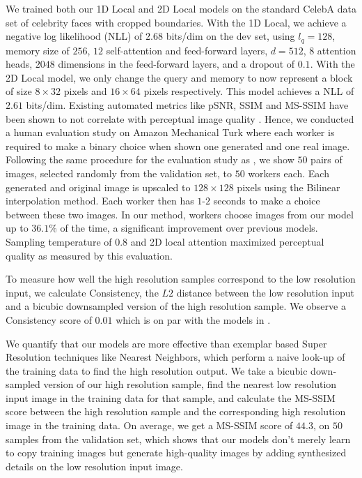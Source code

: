 \documentclass{article}
\newcommand{\modeldim}{d}
\begin{document}
We trained both our 1D Local and 2D Local models on the standard CelebA data set of celebrity faces with cropped boundaries. With the 1D Local, we achieve a negative log likelihood (NLL) of $\mathbf{2.68}$ bits/dim on the dev set, using $l_q=128$, memory size of $256$, $12$ self-attention and feed-forward layers, $\modeldim=512$, $8$ attention heads, $2048$ dimensions in the feed-forward layers, and a dropout of $0.1$. With the 2D Local model, we only change the query and memory to now represent a block of size $8\times32$ pixels and $16\times64$ pixels respectively. This model achieves a NLL of $\mathbf{2.61}$ bits/dim.
Existing automated metrics like pSNR, SSIM and MS-SSIM have been shown to not correlate with perceptual image quality \citep{PixelRecursiveSuperResolution}. Hence, we conducted a human evaluation study on Amazon Mechanical Turk where each worker is required to make a binary choice when shown one generated and one real image. Following the same procedure for the evaluation study as \cite{PixelRecursiveSuperResolution}, we show $50$ pairs of images, selected randomly from the validation set, to $50$ workers each. Each generated and original image is upscaled to $128\times128$ pixels using the Bilinear interpolation method. Each worker then has $1$-$2$ seconds to make a choice between these two images. In our method, workers choose images from our model up to $36.1$\% of the time, a significant improvement over previous models. Sampling temperature of $0.8$ and 2D local attention maximized perceptual quality as measured by this evaluation.

To measure how well the high resolution samples correspond to the low resolution input, we calculate Consistency, the $L2$ distance between the low resolution input and a bicubic downsampled version of the high resolution sample. We observe a Consistency score of $0.01$ which is on par with the models in \cite{PixelRecursiveSuperResolution}. 

We quantify that our models are more effective than exemplar based Super Resolution techniques like Nearest Neighbors, which perform a naive look-up of the training data to find the high resolution output. We take a bicubic down-sampled version of our high resolution sample, find the nearest low resolution input image in the training data for that sample, and calculate the MS-SSIM score between the high resolution sample and the corresponding high resolution image in the training data. On average, we get a MS-SSIM score of $44.3$, on $50$ samples from the validation set, which shows that our models don't merely learn to copy training images but generate high-quality images by adding synthesized details on the low resolution input image.
\end{document}
